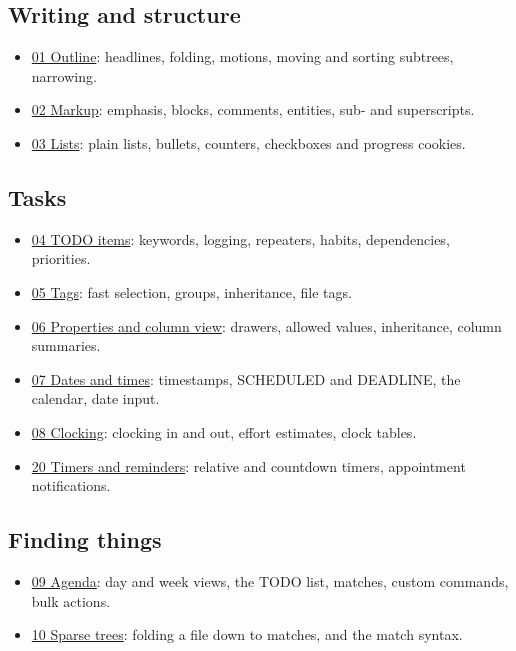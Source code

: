 \subsection{Writing and structure}
\label{sec:orgaf6c356}
\begin{itemize}
\item \href{01-outline.org}{01 Outline}: headlines, folding, motions, moving and sorting subtrees,
narrowing.
\item \href{02-markup.org}{02 Markup}: emphasis, blocks, comments, entities, sub- and
superscripts.
\item \href{03-lists.org}{03 Lists}: plain lists, bullets, counters, checkboxes and progress
cookies.
\end{itemize}
\subsection{Tasks}
\label{sec:org2fc59bc}
\begin{itemize}
\item \href{04-todo.org}{04 TODO items}: keywords, logging, repeaters, habits, dependencies,
priorities.
\item \href{05-tags.org}{05 Tags}: fast selection, groups, inheritance, file tags.
\item \href{06-properties-columns.org}{06 Properties and column view}: drawers, allowed values, inheritance,
column summaries.
\item \href{07-dates.org}{07 Dates and times}: timestamps, SCHEDULED and DEADLINE, the calendar,
date input.
\item \href{08-clocking.org}{08 Clocking}: clocking in and out, effort estimates, clock tables.
\item \href{20-timers-reminders.org}{20 Timers and reminders}: relative and countdown timers, appointment
notifications.
\end{itemize}
\subsection{Finding things}
\label{sec:orge8718bb}
\begin{itemize}
\item \href{09-agenda.org}{09 Agenda}: day and week views, the TODO list, matches, custom commands,
bulk actions.
\item \href{10-sparse-trees.org}{10 Sparse trees}: folding a file down to matches, and the match syntax.
\end{itemize}
